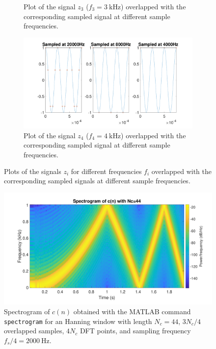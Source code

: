 \documentclass[a4paper, oneside, 11pt]{article}
\begin{document}
\begin{figure}[ht!]
\begin{subfigure}[b]{0.49\textwidth}
         \caption{Plot of the signal $z_3$ ($f_3 = \SI{3}{\kilo \hertz}$) overlapped with the corresponding sampled signal at different sample frequencies.}
         \label{fig:z_3000}
     \end{subfigure}
     \hfill
     \begin{subfigure}[b]{0.49\textwidth}
         \centering
         \includegraphics[width=\textwidth]{figures/plot_z_4000_Hz.pdf}
         \caption{Plot of the signal $z_4$ ($f_4 = \SI{4}{\kilo \hertz}$) overlapped with the corresponding sampled signal at different sample frequencies.}
         \label{fig:z_4000}
     \end{subfigure}
     \caption{Plots of the signals $z_i$ for different frequencies $f_i$ overlapped with the corresponding sampled signals at different sample frequencies.}
\end{figure}

\begin{figure}[ht!]
    \centering
    \includegraphics[width = 0.8 \textwidth]{figures/spectrogram_c.pdf}
    \caption{Spectrogram of $c(n)$ obtained with the MATLAB{\texttrademark} command \texttt{spectrogram} for an Hanning window with length $N_c = 44$, $3N_c/4$ overlapped samples, $4 N_c$ DFT points, and sampling frequency $f_s/4 = \SI{2000}{\hertz}$.}
    \label{fig:spectrogram_c}
\end{figure}
\end{document}
